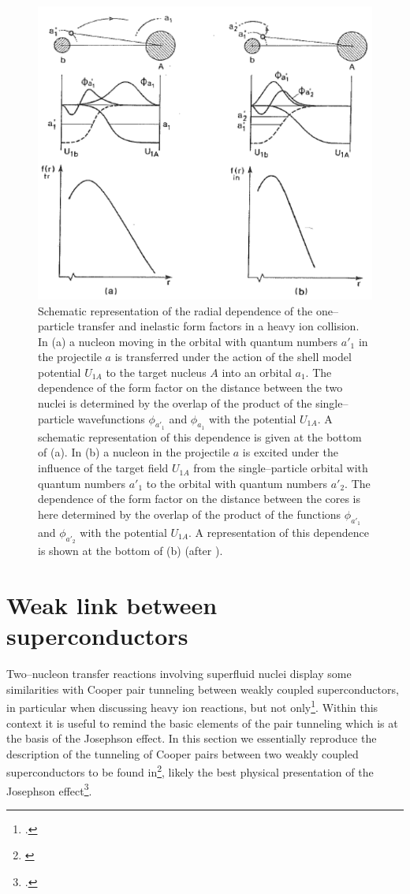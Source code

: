 \begin{figure}
\centerline{\includegraphics*[width=\textwidth,angle=0.3]{nutshell/figs/fig2B3.pdf}}
\caption{Schematic representation of the radial dependence of the one--particle transfer and inelastic form factors in a heavy ion collision. In (a) a nucleon moving in the orbital with quantum numbers $a'_1$ in the projectile $a$ is transferred under the action of the shell model potential $U_{1A}$ to the target nucleus $A$ into an orbital $a_1$. The dependence of the form factor on the distance between the two nuclei is determined by the overlap of the product of the single--particle wavefunctions $\phi_{a'_1}$ and $\phi_{a_1}$ with the potential $U_{1A}$. A schematic representation of this dependence is given at the bottom of (a). In (b) a nucleon in the projectile $a$ is excited under the influence of the target field $U_{1A}$ from the single--particle orbital with quantum numbers $a'_1$ to the orbital with quantum numbers $a'_2$. The dependence of the form factor on the distance between the cores is here determined by the overlap of the product of the functions $\phi_{a'_1}$ and $\phi_{a'_2}$ with the potential $U_{1A}$. A representation of  this dependence is shown at the bottom of (b) (after \cite{Broglia:04a}).}\label{fig_4}
\end{figure}

\section{Weak link between superconductors}\label{C3AppC}
Two--nucleon transfer reactions involving superfluid nuclei display some similarities with Cooper pair tunneling between weakly coupled superconductors, in particular when discussing heavy ion reactions, but not only\footnote{\cite{vonOertzen:01,Oertzen:13,Broglia:04a}.}. Within this context it is useful to remind the basic elements of the pair tunneling which is at the basis of the Josephson effect. 
In this section we essentially reproduce the description of the tunneling of Cooper pairs between two weakly coupled superconductors to be found in\footnote{\cite{Anderson:64b}}, likely the best physical presentation of the Josephson effect\footnote{\cite{Josephson:62}.}.


